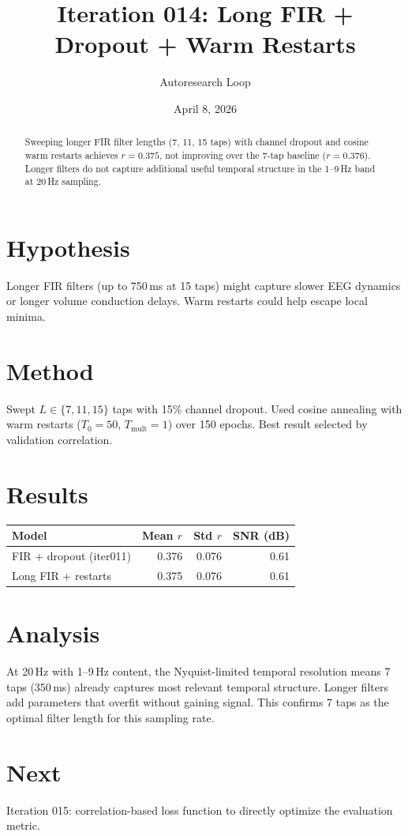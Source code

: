 \documentclass[11pt,a4paper]{article}
\title{Iteration 014: Long FIR + Dropout + Warm Restarts}
\author{Autoresearch Loop}
\date{April 8, 2026}
\begin{document}
\maketitle

\begin{abstract}
Sweeping longer FIR filter lengths (7, 11, 15 taps) with channel dropout and
cosine warm restarts achieves $r=0.375$, not improving over the 7-tap baseline
($r=0.376$). Longer filters do not capture additional useful temporal structure
in the 1--9\,Hz band at 20\,Hz sampling.
\end{abstract}

\section{Hypothesis}
Longer FIR filters (up to 750\,ms at 15 taps) might capture slower EEG dynamics
or longer volume conduction delays. Warm restarts could help escape local minima.

\section{Method}
Swept $L \in \{7, 11, 15\}$ taps with 15\% channel dropout. Used cosine
annealing with warm restarts ($T_0=50$, $T_\text{mult}=1$) over 150 epochs.
Best result selected by validation correlation.

\section{Results}
\begin{table}[H]
\centering
\begin{tabular}{lrrr}
\toprule
Model & Mean $r$ & Std $r$ & SNR (dB) \\
\midrule
FIR + dropout (iter011) & 0.376 & 0.076 & 0.61 \\
Long FIR + restarts & 0.375 & 0.076 & 0.61 \\
\bottomrule
\end{tabular}
\end{table}

\section{Analysis}
At 20\,Hz with 1--9\,Hz content, the Nyquist-limited temporal resolution means
7 taps (350\,ms) already captures most relevant temporal structure. Longer filters
add parameters that overfit without gaining signal. This confirms 7 taps as the
optimal filter length for this sampling rate.

\section{Next}
Iteration 015: correlation-based loss function to directly optimize the evaluation metric.
\end{document}
